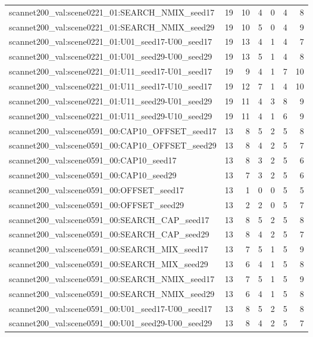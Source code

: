 \begin{table}[t]
\begin{tabular}{lrrrrrr}
scannet200\_val:scene0221\_01:SEARCH\_NMIX\_seed17 & 19 & 10 & 4 & 0 & 4 & 8 \\
scannet200\_val:scene0221\_01:SEARCH\_NMIX\_seed29 & 19 & 10 & 5 & 0 & 4 & 9 \\
scannet200\_val:scene0221\_01:U01\_seed17-U00\_seed17 & 19 & 13 & 4 & 1 & 4 & 7 \\
scannet200\_val:scene0221\_01:U01\_seed29-U00\_seed29 & 19 & 13 & 5 & 1 & 4 & 8 \\
scannet200\_val:scene0221\_01:U11\_seed17-U01\_seed17 & 19 & 9 & 4 & 1 & 7 & 10 \\
scannet200\_val:scene0221\_01:U11\_seed17-U10\_seed17 & 19 & 12 & 7 & 1 & 4 & 10 \\
scannet200\_val:scene0221\_01:U11\_seed29-U01\_seed29 & 19 & 11 & 4 & 3 & 8 & 9 \\
scannet200\_val:scene0221\_01:U11\_seed29-U10\_seed29 & 19 & 11 & 4 & 1 & 6 & 9 \\
scannet200\_val:scene0591\_00:CAP10\_OFFSET\_seed17 & 13 & 8 & 5 & 2 & 5 & 8 \\
scannet200\_val:scene0591\_00:CAP10\_OFFSET\_seed29 & 13 & 8 & 4 & 2 & 5 & 7 \\
scannet200\_val:scene0591\_00:CAP10\_seed17 & 13 & 8 & 3 & 2 & 5 & 6 \\
scannet200\_val:scene0591\_00:CAP10\_seed29 & 13 & 7 & 3 & 2 & 5 & 6 \\
scannet200\_val:scene0591\_00:OFFSET\_seed17 & 13 & 1 & 0 & 0 & 5 & 5 \\
scannet200\_val:scene0591\_00:OFFSET\_seed29 & 13 & 2 & 2 & 0 & 5 & 7 \\
scannet200\_val:scene0591\_00:SEARCH\_CAP\_seed17 & 13 & 8 & 5 & 2 & 5 & 8 \\
scannet200\_val:scene0591\_00:SEARCH\_CAP\_seed29 & 13 & 8 & 4 & 2 & 5 & 7 \\
scannet200\_val:scene0591\_00:SEARCH\_MIX\_seed17 & 13 & 7 & 5 & 1 & 5 & 9 \\
scannet200\_val:scene0591\_00:SEARCH\_MIX\_seed29 & 13 & 6 & 4 & 1 & 5 & 8 \\
scannet200\_val:scene0591\_00:SEARCH\_NMIX\_seed17 & 13 & 7 & 5 & 1 & 5 & 9 \\
scannet200\_val:scene0591\_00:SEARCH\_NMIX\_seed29 & 13 & 6 & 4 & 1 & 5 & 8 \\
scannet200\_val:scene0591\_00:U01\_seed17-U00\_seed17 & 13 & 8 & 5 & 2 & 5 & 8 \\
scannet200\_val:scene0591\_00:U01\_seed29-U00\_seed29 & 13 & 8 & 4 & 2 & 5 & 7 \\

\end{tabular}
\end{table}
